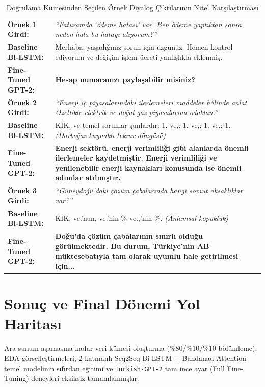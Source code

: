 \documentclass[conference]{IEEEtran}
\begin{document}
\begin{table}[htbp]
    \centering
    \caption{Doğrulama Kümesinden Seçilen Örnek Diyalog Çıktılarının Nitel Karşılaştırması}
    \label{tab:qualitative}
    \footnotesize
    \begin{tabularx}{\columnwidth}{>{\bfseries}p{2.35cm} X}
        \toprule
        Örnek 1 Girdi: & \textit{``Faturamda 'ödeme hatası' var. Ben ödeme yaptıktan sonra neden hala bu hatayı alıyorum?''} \\
        \addlinespace[3pt]
        Baseline Bi-LSTM: & Merhaba, yaşadığınız sorun için üzgünüz. Hemen kontrol ediyorum ve değişim işlem ücreti yanlışlıkla eklenmiş. \\
        \addlinespace[3pt]
        Fine-Tuned GPT-2: & \textbf{Hesap numaranızı paylaşabilir misiniz?} \\
        \midrule
        Örnek 2 Girdi: & \textit{``Enerji iç piyasalarındaki ilerlemeleri maddeler hâlinde anlat. Özellikle elektrik ve doğal gaz piyasalarına odaklan.''} \\
        \addlinespace[3pt]
        Baseline Bi-LSTM: & KİK, ve temel sorunlar şunlardır: 1. ve,: 1. ve,: 1. ve,: 1. \textit{(Darboğaz kaynaklı tekrar döngüsü)} \\
        \addlinespace[3pt]
        Fine-Tuned GPT-2: & \textbf{Enerji sektörü, enerji verimliliği gibi alanlarda önemli ilerlemeler kaydetmiştir. Enerji verimliliği ve yenilenebilir enerji kaynakları konusunda ise önemli adımlar atılmıştır.} \\
        \midrule
        Örnek 3 Girdi: & \textit{``Güneydoğu'daki çözüm çabalarında hangi somut aksaklıklar var?''} \\
        \addlinespace[3pt]
        Baseline Bi-LSTM: & KİK, ve.'nun, ve.'nin \% ve.,'nin \%. \textit{(Anlamsal kopukluk)} \\
        \addlinespace[3pt]
        Fine-Tuned GPT-2: & \textbf{Doğu'da çözüm çabalarının sınırlı olduğu görülmektedir. Bu durum, Türkiye'nin AB müktesebatıyla tam olarak uyumlu hale getirilmesi için...} \\
        \bottomrule
    \end{tabularx}
\end{table}

\section{Sonuç ve Final Dönemi Yol Haritası}
Ara sunum aşamasına kadar veri kümesi oluşturma (\%80/\%10/\%10 bölümleme), EDA görselleştirmeleri, 2 katmanlı Seq2Seq Bi-LSTM + Bahdanau Attention temel modelinin sıfırdan eğitimi ve \texttt{Turkish-GPT-2} tam ince ayar (Full Fine-Tuning) deneyleri eksiksiz tamamlanmıştır.
\end{document}
